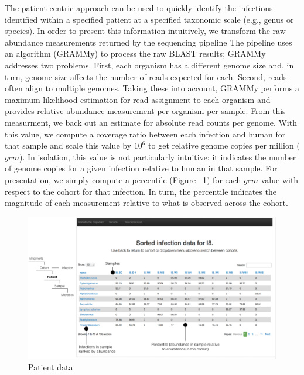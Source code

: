 The patient-centric approach can be used to quickly identify the infections identified within a specified patient at a specified taxonomic scale (e.g., genus or species). In order to present this information intuitively, we transform the raw abundance measurements returned by the sequencing pipeline The pipeline uses an algorithm (GRAMMy) to process the raw BLAST results; GRAMMy addresses two problems. First, each organism has a different genome size and, in turn, genome size affects the number of reads expected for each. Second, reads often align to multiple genomes. Taking these into account, GRAMMy performs a maximum likelihood estimation for read assignment to each organism and provides relative abundance measurement per organism per sample. From this measurment, we back out an estimate for absolute read counts per genome. With this value, we compute a coverage ratio between each infection and human for that sample and scale this value by $10^6$ to get relative genome copies per million ($gcm$). In isolation, this value is not particularly intuitive: it indicates the number of genome copies for a given infection relative to human in that sample. For presentation, we simply compute a percentile (Figure ~\ref{fig:Fig6}) for each $gcm$ value with respect to the cohort for that infection. In turn, the percentile indicates the magnitude of each measurement relative to what is observed across the cohort. 

\begin{figure}
\center\includegraphics[width=150mm,scale=0.5]{Figures/Fig6}
\caption{Patient data}
\label{fig:Fig6}
\end{figure}

